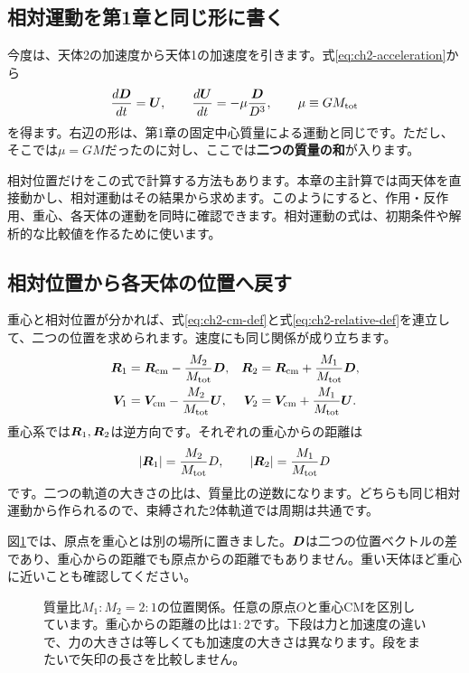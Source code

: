 \subsection{相対運動を第1章と同じ形に書く}
今度は、天体2の加速度から天体1の加速度を引きます。式\eqref{eq:ch2-acceleration}から
\begin{equation}
\frac{d\boldsymbol D}{dt}=\boldsymbol U,\qquad
\frac{d\boldsymbol U}{dt}=-\mu\frac{\boldsymbol D}{D^3},\qquad
\mu\equiv GM_{\rm tot}
\label{eq:ch2-relative-ode}
\end{equation}
を得ます。右辺の形は、第1章の固定中心質量による運動と同じです。ただし、そこでは$\mu=GM$だったのに対し、ここでは\textbf{二つの質量の和}が入ります。\cite{ryden2025}

相対位置だけをこの式で計算する方法もあります。本章の主計算では両天体を直接動かし、相対運動はその結果から求めます。このようにすると、作用・反作用、重心、各天体の運動を同時に確認できます。相対運動の式は、初期条件や解析的な比較値を作るために使います。

\subsection{相対位置から各天体の位置へ戻す}
重心と相対位置が分かれば、式\eqref{eq:ch2-cm-def}と式\eqref{eq:ch2-relative-def}を連立して、二つの位置を求められます。速度にも同じ関係が成り立ちます。
\begin{align}
\boldsymbol R_1&=\boldsymbol R_{\rm cm}-\frac{M_2}{M_{\rm tot}}\boldsymbol D,&
\boldsymbol R_2&=\boldsymbol R_{\rm cm}+\frac{M_1}{M_{\rm tot}}\boldsymbol D,\nonumber\\
\boldsymbol V_1&=\boldsymbol V_{\rm cm}-\frac{M_2}{M_{\rm tot}}\boldsymbol U,&
\boldsymbol V_2&=\boldsymbol V_{\rm cm}+\frac{M_1}{M_{\rm tot}}\boldsymbol U.
\label{eq:ch2-inverse-transform}
\end{align}
重心系では$\boldsymbol R_1,\boldsymbol R_2$は逆方向です。それぞれの重心からの距離は
\begin{equation}
|\boldsymbol R_1|=\frac{M_2}{M_{\rm tot}}D,\qquad
|\boldsymbol R_2|=\frac{M_1}{M_{\rm tot}}D
\label{eq:ch2-cm-radii}
\end{equation}
です。二つの軌道の大きさの比は、質量比の逆数になります。どちらも同じ相対運動から作られるので、束縛された2体軌道では周期は共通です。\cite{ryden2025}


図\ref{fig:concept-ch2-cm}では、原点を重心とは別の場所に置きました。$\boldsymbol D$は二つの位置ベクトルの差であり、重心からの距離でも原点からの距離でもありません。重い天体ほど重心に近いことも確認してください。
\begin{figure}[!htbp]
\centering

\caption{質量比$M_1:M_2=2:1$の位置関係。任意の原点$O$と重心CMを区別しています。重心からの距離の比は$1:2$です。下段は力と加速度の違いで、力の大きさは等しくても加速度の大きさは異なります。段をまたいで矢印の長さを比較しません。}
\label{fig:concept-ch2-cm}
\end{figure}
\FloatBarrier

